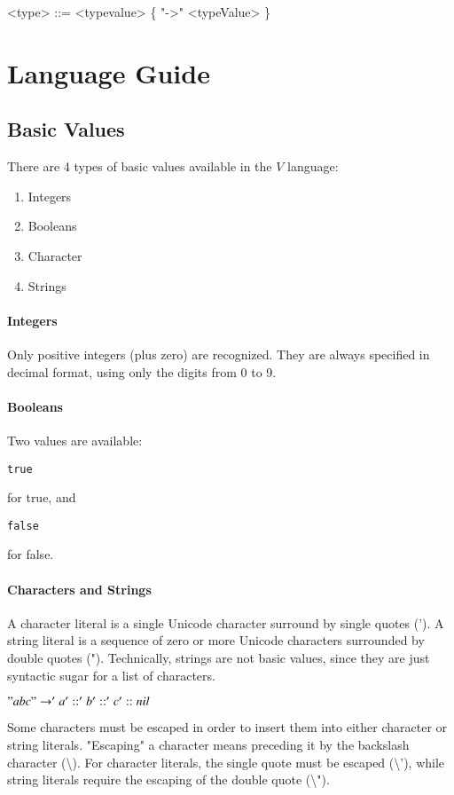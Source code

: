 \documentclass{article}
\def\code#1{\begin{footnotesize}\texttt{#1}\end{footnotesize}}
\begin{document}
\begin{grammar}
  <type> ::= <typevalue> \textvisiblespace \{  "->" <typeValue> \textvisiblespace \}
\end{grammar}

\section{Language Guide}

\subsection{Basic Values}

There are 4 types of basic values available in the $V$ language:

\begin{enumerate}
  \item Integers
  \item Booleans
  \item Character
  \item Strings
\end{enumerate}

\paragraph{Integers}
Only positive integers (plus zero) are recognized.
They are always specified in decimal format,  using only the digits from 0 to 9.

\paragraph{Booleans}
Two values are available: \code{true} for true, and \code{false} for false.

\paragraph{Characters and Strings}
A character literal is a single Unicode character surround by single quotes (').
A string literal is a sequence of zero or more Unicode characters surrounded by double quotes (").
Technically, strings are not basic values, since they are just syntactic sugar for a list of characters.

$"abc" \rightarrow 'a' :: 'b' :: 'c' :: nil$

\bigskip

Some characters must be escaped in order to insert them into either character or string literals.
"Escaping" a character means preceding it by the backslash character (\textbackslash).
For character literals, the single quote must be escaped (\textbackslash'), while string literals require the escaping of the double quote (\textbackslash").
\end{document}
